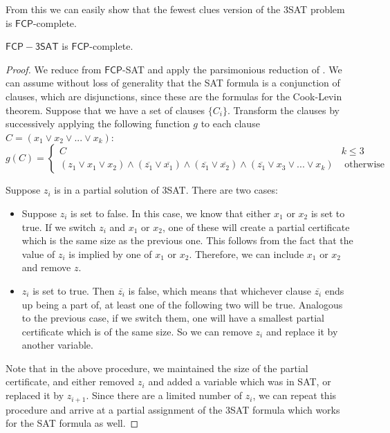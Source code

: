 \documentclass[runningheads,a4paper]{llncs}
\begin{document}
From this we can easily show that the fewest clues version of the 3SAT problem is $\mathsf{FCP}$-complete.

\begin{theorem}
$\mathsf{FCP-3SAT}$ is $\mathsf{FCP}$-complete.
\end{theorem}

\begin{proof}
We reduce from $\mathsf{FCP}$-SAT and apply the parsimonious reduction of \cite{yaleclass}. We can assume without loss of generality that the SAT formula is a conjunction of clauses, which are disjunctions, since these are the formulas for the Cook-Levin theorem. Suppose that we have a set of clauses $\{ C_i \}$. Transform the clauses by successively applying the following function $g$ to each clause $C = (x_1 \vee x_2 \vee ... \vee x_k)$:
\[ g(C) = \left\{ \begin{array}{cc} C & k \leq 3 \\
						    (z_1 \vee x_1 \vee x_2) \wedge (\overline{z_1} \vee \overline{x_1}) \wedge (\overline{z_1} \vee \overline{x_2}) \wedge (\overline{z_1} \vee x_3 \vee ... \vee x_k) & \text{ otherwise }\end{array} \right. \] 

Suppose $z_i$ is in a partial solution of 3SAT. There are two cases:
\begin{itemize}
\item Suppose $z_i$ is set to false. In this case, we know that either $x_1$ or $x_2$ is set to true. If we switch $z_i$ and $x_1$ or $x_2$, one of these will create a partial certificate which is the same size as the previous one. This follows from the fact that the value of $z_i$ is implied by one of $x_1$ or $x_2$. Therefore, we can include $x_1$ or $x_2$ and remove $z$.
\item $z_i$ is set to true. Then $\overline{z_i}$ is false, which means that whichever clause $\overline{z_i}$ ends up being a part of, at least one of the following two will be true. Analogous to the previous case, if we switch them, one will have a smallest partial certificate which is of the same size. So we can remove $z_i$ and replace it by another variable. 
\end{itemize}
Note that in the above procedure, we maintained the size of the partial certificate, and either removed $z_i$ and added a variable which was in SAT, or replaced it by $z_{i+1}$. Since there are a limited number of $z_i$, we can repeat this procedure and arrive at a partial assignment of the 3SAT formula which works for the SAT formula as well.
\end{proof}
\end{document}
